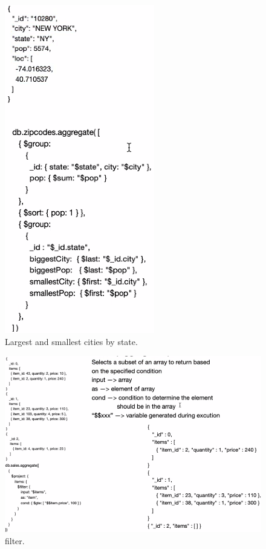 \documentclass{article}
\begin{document}
\begin{figure}[h!]
\includegraphics[scale=0.7]{13.png}
\caption{Largest and smallest cities by state.}
\end{figure}
\begin{figure}[h!]
\includegraphics[scale=0.7]{14.png}
\caption{filter.}
\end{figure}
\end{document}
